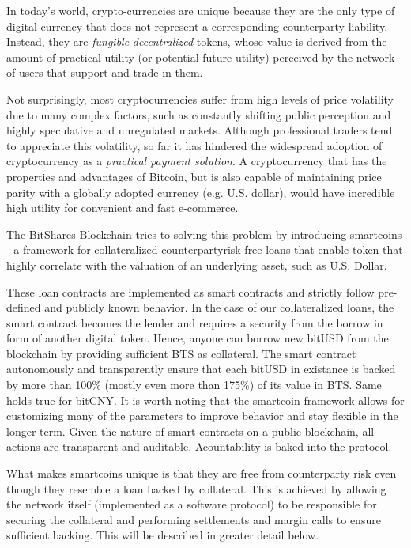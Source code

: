 \label{sec:mpa}
In today's world, crypto-currencies are unique because they are the only type
of digital currency that does not represent a corresponding counterparty
liability. Instead, they are \emph{fungible} \emph{decentralized} tokens, whose
value is derived from the amount of practical utility (or potential future
utility) perceived by the network of users that support and trade in them.

Not surprisingly, most cryptocurrencies suffer from high levels of price
volatility due to many complex factors, such as constantly shifting
public perception and highly speculative and unregulated markets.
Although professional traders tend to appreciate this volatility, so far
it has hindered the widespread adoption of cryptocurrency as a
\emph{practical payment solution}. A cryptocurrency that has the
properties and advantages of Bitcoin, but is also capable of maintaining
price parity with a globally adopted currency (e.g. U.S. dollar), would
have incredible high utility for convenient and fast e-commerce.

The BitShares Blockchain tries to solving this problem by introducing
smartcoins - a framework for collateralized counterpartyrisk-free loans
that enable token that highly correlate with the valuation of an
underlying asset, such as U.S. Dollar.

These loan contracts are implemented as smart contracts and strictly
follow pre-defined and publicly known behavior. In the case of our
collateralized loans, the smart contract becomes the lender and requires
a security from the borrow in form of another digital token. Hence,
anyone can borrow new bitUSD from the blockchain by providing sufficient
BTS as collateral. The smart contract autonomously and transparently
ensure that each bitUSD in existance is backed by more than 100\%
(mostly even more than 175\%) of its value in BTS. Same holds true for
bitCNY. It is worth noting that the smartcoin framework allows for
customizing many of the parameters to improve behavior and stay flexible
in the longer-term. Given the nature of smart contracts on a public
blockchain, all actions are transparent and auditable. Acountability is
baked into the protocol.

What makes smartcoins unique is that they are free from counterparty
risk even though they resemble a loan backed by collateral. This is
achieved by allowing the network itself (implemented as a software
protocol) to be responsible for securing the collateral and performing
settlements and margin calls to ensure sufficient backing. This will be
described in greater detail below.
